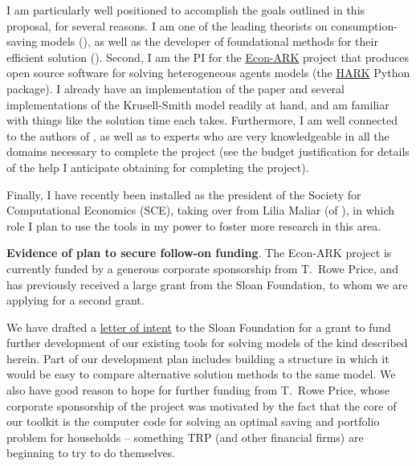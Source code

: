 \documentclass[11pt,pdftex,letterpaper]{article}
\begin{document}


      I am particularly well positioned to accomplish the goals outlined in this proposal, for several reasons.  I am one of the leading theorists on consumption-saving models (\cite{CarrollBuffer}), as well as the developer of foundational methods for their efficient solution (\cite{CarrollEGM}). Second, I am the PI for the \href{https://econ-ark.org}{Econ-ARK} project that produces open source software for solving heterogeneous agents models (the \href{https://github.com/econ-ark/HARK}{HARK} Python package).  I already have an implementation of the \cite{MALIAR202176} paper and several implementations of the Krusell-Smith model readily at hand, and am familiar with things like the solution time each takes. Furthermore, I am well connected to the authors of \cite{MALIAR202176}, as well as to experts who are very knowledgeable in all the domains necessary to complete the project (see the budget justification for details of the help I anticipate obtaining for completing the project).

Finally, I have recently been installed as the president of the Society for Computational Economics (SCE), taking over from Lilia Maliar (of \cite{MALIAR202176}), in which role I plan to use the tools in my power to foster more research in this area. 

      
\textbf{Evidence of plan to secure follow-on funding}. 
The Econ-ARK project is currently funded by a generous corporate sponsorship from T.\ Rowe Price, and has previously received a large grant from the Sloan Foundation, to whom we are applying for a second grant.

We have drafted a \href{https://github.com/econ-ark/OverARK/blob/master/roadmap/docs/Sloan/2024-Small-Grant/TwoPageLOIforEcon-ARK_Sloan.md}{letter of intent} to the Sloan Foundation for a grant to fund further development of our existing tools for solving models of the kind described herein.  Part of our development plan includes building a structure in which it would be easy to compare alternative solution methods to the same model. We also have good reason to hope for further funding from T.\ Rowe Price, whose corporate sponsorship of the project was motivated by the fact that the core of our toolkit is the computer code for solving an optimal saving and portfolio problem for households -- something TRP (and other financial firms) are beginning to try to do themselves.
\end{document}
